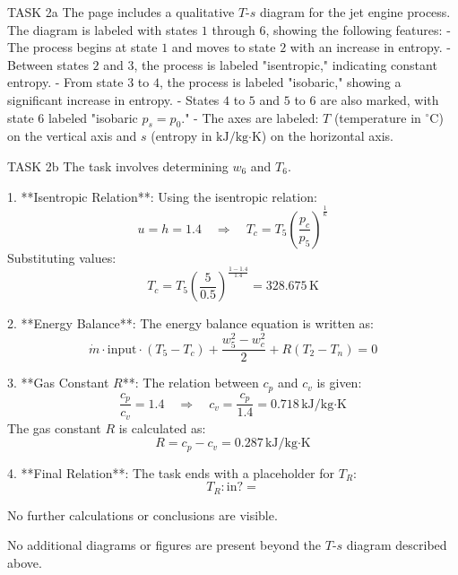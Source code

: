TASK 2a  
The page includes a qualitative \( T \)-\( s \) diagram for the jet engine process. The diagram is labeled with states \( 1 \) through \( 6 \), showing the following features:  
- The process begins at state \( 1 \) and moves to state \( 2 \) with an increase in entropy.  
- Between states \( 2 \) and \( 3 \), the process is labeled "isentropic," indicating constant entropy.  
- From state \( 3 \) to \( 4 \), the process is labeled "isobaric," showing a significant increase in entropy.  
- States \( 4 \) to \( 5 \) and \( 5 \) to \( 6 \) are also marked, with state \( 6 \) labeled "isobaric \( p_s = p_0 \)."  
- The axes are labeled: \( T \) (temperature in \( ^\circ \text{C} \)) on the vertical axis and \( s \) (entropy in \( \text{kJ/kg·K} \)) on the horizontal axis.  

TASK 2b  
The task involves determining \( w_6 \) and \( T_6 \).  

1. **Isentropic Relation**:  
   Using the isentropic relation:  
   \[
   u = h = 1.4 \quad \Rightarrow \quad T_c = T_5 \left( \frac{p_c}{p_5} \right)^{\frac{1}{\kappa}}
   \]  
   Substituting values:  
   \[
   T_c = T_5 \left( \frac{5}{0.5} \right)^{\frac{1-1.4}{1.4}} = 328.675 \, \text{K}
   \]  

2. **Energy Balance**:  
   The energy balance equation is written as:  
   \[
   \dot{m} \cdot \text{input} \cdot (T_5 - T_c) + \frac{w_5^2 - w_c^2}{2} + R(T_2 - T_n) = 0
   \]  

3. **Gas Constant \( R \)**:  
   The relation between \( c_p \) and \( c_v \) is given:  
   \[
   \frac{c_p}{c_v} = 1.4 \quad \Rightarrow \quad c_v = \frac{c_p}{1.4} = 0.718 \, \text{kJ/kg·K}
   \]  
   The gas constant \( R \) is calculated as:  
   \[
   R = c_p - c_v = 0.287 \, \text{kJ/kg·K}
   \]  

4. **Final Relation**:  
   The task ends with a placeholder for \( T_R \):  
   \[
   T_R: \text{in?} = 
   \]  

No further calculations or conclusions are visible.  

No additional diagrams or figures are present beyond the \( T \)-\( s \) diagram described above.